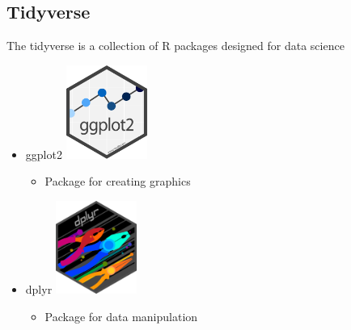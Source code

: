 \documentclass[
  letterpaper,
  DIV=11,
  numbers=noendperiod,
  landscape]{scrartcl}
\providecommand{\tightlist}{%
  \setlength{\itemsep}{0pt}\setlength{\parskip}{0pt}}\usepackage{longtable,booktabs,array}
\begin{document}
\hypertarget{tidyverse-1}{%
\subsection{Tidyverse}\label{tidyverse-1}}

The tidyverse is a collection of R packages designed for data science

\begin{itemize}
\item
  ggplot2
  \includegraphics[width=1.04167in,height=\textheight]{images/ggplot2.png}

  \begin{itemize}
  \tightlist
  \item
    Package for creating graphics
  \end{itemize}
\item
  dplyr
  \includegraphics[width=1.04167in,height=\textheight]{images/dplyr.png}

  \begin{itemize}
  \tightlist
  \item
    Package for data manipulation
  \end{itemize}
\end{itemize}
\end{document}
